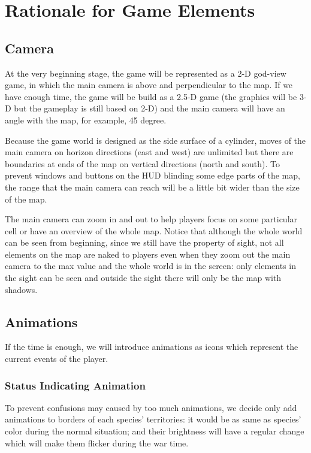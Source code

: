 \section{Rationale for Game Elements}

\subsection{Camera}
At the very beginning stage, the game will be represented as a 2-D god-view game, in which the main camera is above and perpendicular to the map. If we have enough time, the game will be build as a 2.5-D game (the graphics will be 3-D but the gameplay is still based on 2-D) and the main camera will have an angle with the map, for example, 45 degree. 

Because the game world is designed as the side surface of a cylinder, moves of the main camera on horizon directions (east and west) are unlimited but there are boundaries at ends of the map on vertical directions (north and south). To prevent windows and buttons on the HUD blinding some edge parts of the map, the range that the main camera can reach will be a little bit wider than the size of the map.

The main camera can zoom in and out to help players focus on some particular cell or have an overview of the whole map. Notice that although the whole world can be seen from beginning, since we still have the property of sight, not all elements on the map are naked to players even when they zoom out the main camera to the max value and the whole world is in the screen: only elements in the sight can be seen and outside the sight there will only be the map with shadows.

\subsection{Animations}
If the time is enough, we will introduce animations as icons which represent the current events of the player.
\subsubsection{Status Indicating Animation}
To prevent confusions may caused by too much animations, we decide only add animations to borders of each species' territories: it would be as same as species' color during the normal situation; and their brightness will have a regular change which will make them flicker during the war time.

